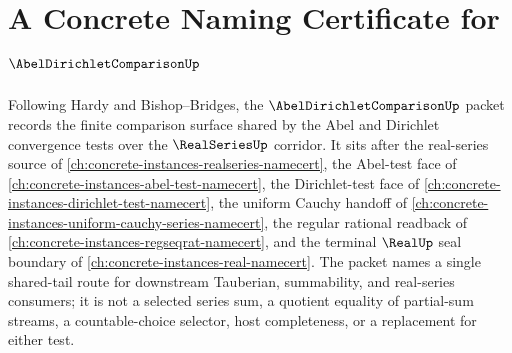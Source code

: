 \chapter{A Concrete Naming Certificate for $\AbelDirichletComparisonUp$}
\label{ch:concrete-instances-abel-dirichlet-comparison-namecert}

Following Hardy and Bishop--Bridges, the $\AbelDirichletComparisonUp$ packet records the finite comparison surface shared by the Abel and Dirichlet convergence tests over the $\RealSeriesUp$ corridor. It sits after the real-series source of \autoref{ch:concrete-instances-realseries-namecert}, the Abel-test face of \autoref{ch:concrete-instances-abel-test-namecert}, the Dirichlet-test face of \autoref{ch:concrete-instances-dirichlet-test-namecert}, the uniform Cauchy handoff of \autoref{ch:concrete-instances-uniform-cauchy-series-namecert}, the regular rational readback of \autoref{ch:concrete-instances-regseqrat-namecert}, and the terminal $\RealUp$ seal boundary of \autoref{ch:concrete-instances-real-namecert}. The packet names a single shared-tail route for downstream Tauberian, summability, and real-series consumers; it is not a selected series sum, a quotient equality of partial-sum streams, a countable-choice selector, host completeness, or a replacement for either test.

